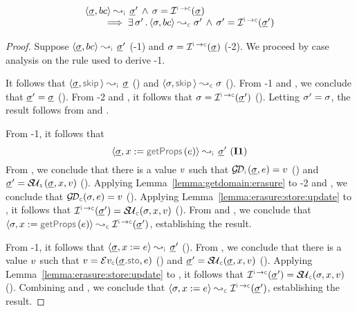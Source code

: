 \begin{lemma}\label{lemma:erasure:basic:commands}
$$
\begin{array}{l}
\absbsemrule{\istate, \bcmd}{\istate'}{\instrumented} 
    \, \wedge \, \jstate = \interpret{\instconc}{}(\istate) \\ \quad \quad
     \implies 
        \exists \, \jstate' \, . \, \absbsemrule{\jstate, \bcmd}{\jstate'}{\concrete} \, \wedge \, 
            \jstate' = \interpret{\instconc}{}(\istate')
\end{array}
$$
\end{lemma}
\begin{proof}
Suppose $\absbsemrule{\istate, \bcmd}{\istate'}{\instrumented}$ (\hyp{1}) and 
$\jstate = \interpret{\instconc}{}(\istate)$ (\hyp{2}).
We proceed by case analysis on the rule used to derive \hyp{1}. 
\vspace{3pt}

\noindent {} It follows that $\absbsemrule{\istate, \jsilskip}{\istate}{\instrumented}$ () and 
$\absbsemrule{\jstate, \jsilskip}{\jstate}{\concrete}$ (). 
From \hyp{1} and , we conclude that $\underline{\sigma}' = \underline{\sigma}$ (). 
From \hyp{2} and , it follows that $\jstate = \interpret{\instconc}{}(\istate')$ (). 
Letting $\sigma' = \sigma$, the result follows from  and . 
\vspace{5pt}


\noindent {} From \hyp{1}, it follows that 
$$
\absbsemrule{\istate, \jvar := \getfields(\jsilexpr)}{\istate'}{\instrumented} \text{ (\ieq{1})}
$$ 
From , we conclude that there is a value $v$ such that 
$\absgetdomainfun{\instrumented}(\istate, \jsilexpr) = \val$ () 
and $\istate' = \stupdt{\symbolic}(\istate, \jvar, \val)$ ().  
Applying Lemma~\ref{lemma:getdomain:erasure} to \hyp{2} and , we conclude that 
$\absgetdomainfun{\concrete}(\jstate, \jsilexpr) = \val$ (). 
Applying Lemma~\ref{lemma:erasure:store:update} to , it follows that 
$\interpret{\instconc}{}(\istate') = \stupdt{\concrete}(\jstate, \jvar, \val)$ (). 
From  and , we conclude that $\absbsemrule{\jstate, \jvar := \getfields(\jsilexpr)}{\interpret{\instconc}{}(\istate')}{\concrete}$, 
establishing the result. 
\vspace{5pt}

 \noindent {} From \hyp{1}, it follows that $\absbsemrule{\istate, \jvar := \jsilexpr}{\istate'}{\instrumented}$ (). 
From , we conclude that there is a value $v$ such that 
$\val = \evalexpr{\concrete}(\istate.\stosel, \jsilexpr)$ () and $\istate' = \stupdt{\concrete}(\istate, \jvar, \val)$ (). 
%
Applying Lemma~\ref{lemma:erasure:store:update} to , it follows
that $ \interpret{\instconc}{}(\istate') = \stupdt{\concrete}(\jstate, \jvar, \val)$ ().
% 
Combining  and , we conclude that 
$\absbsemrule{\jstate,\jvar := \jsilexpr}{\interpret{\instconc}{}(\istate')}{\concrete}$, establishing the result. 
\vspace{5pt}
%


\end{proof}
